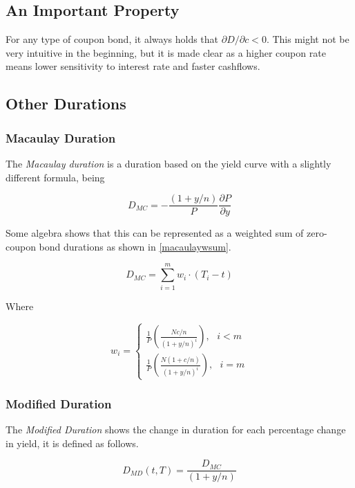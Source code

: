 \documentclass[10pt,letterpaper]{article}
\begin{document}
\subsection{An Important Property}

For any type of coupon bond, it always holds that $\partial D/\partial{c} < 0$. This might not be very intuitive in the beginning, but it is made clear as a higher coupon rate means lower sensitivity to interest rate and faster cashflows.

\subsection{Other Durations}
\subsubsection{Macaulay Duration}
The \emph{Macaulay duration} is a duration based on the yield curve with a slightly different formula, being

\begin{equation}\label{macaulay}
D_{MC} = - \frac{(1 +y/n)}{P}\frac{\partial P}{\partial y}
\end{equation}

Some algebra shows that this can be represented as a weighted sum of zero-coupon bond durations as shown in \eqref{macaulaywsum}.

\begin{equation}\label{macaulaywsum}
D_{MC} = \sum_{i=1}^m w_i\cdot(T_i - t)
\end{equation}

Where

\begin{equation}\label{macaulaycoefs}
w_i = \begin{cases}
\frac{1}{P}\left(\frac{Nc/n}{( 1 + y/n)^i}\right), \mbox{   } i < m \\
\frac{1}{P}\left(\frac{N(1 + c/n)}{( 1 + y/n)^i}\right), \mbox{   } i = m 
\end{cases}
\end{equation}

\subsubsection{Modified Duration}

The \emph{Modified Duration} shows the change in duration for each percentage change in yield, it is defined as follows.

\begin{equation}\label{modifieddur}
D_{MD}(t, T) = \frac{D_{MC}}{(1 + y/n)}
\end{equation}
\end{document}
